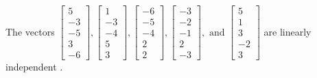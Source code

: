 \begin{exercise}
\begin{exerciseStatement}
  \end{exerciseStatement}
  \begin{exerciseAnswer}
   The vectors \(\left[\begin{array}{r}
5 \\
-3 \\
-5 \\
3 \\
-6
\end{array}\right] , \left[\begin{array}{r}
1 \\
-3 \\
-4 \\
5 \\
3
\end{array}\right] , \left[\begin{array}{r}
-6 \\
-5 \\
-4 \\
2 \\
2
\end{array}\right] , \left[\begin{array}{r}
-3 \\
-2 \\
-1 \\
2 \\
-3
\end{array}\right] , \text{ and } \left[\begin{array}{r}
5 \\
1 \\
3 \\
-2 \\
3
\end{array}\right]\) are 
  	 linearly independent  .
  


  \end{exerciseAnswer}
\end{exercise}